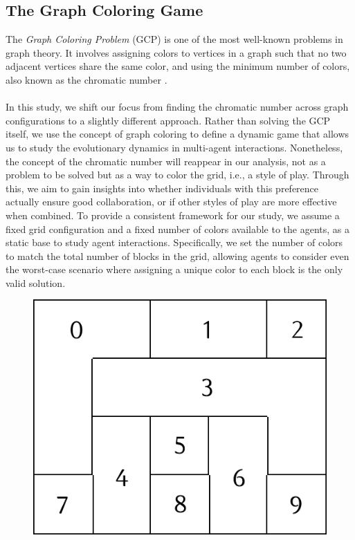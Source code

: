 \subsection{The Graph Coloring Game}

\begin{flushleft}

    The \emph{Graph Coloring Problem} (GCP) is one of the most well-known problems in graph theory. It involves assigning colors to vertices in a graph such that no two adjacent vertices share the same color, and using the minimum number of colors, also known as the chromatic number \cite{watkins2023generating}.\\~\\

    In this study, we shift our focus from finding the chromatic number across graph configurations to a slightly different approach. Rather than solving the GCP itself, we use the concept of graph coloring to define a dynamic game that allows us to study the evolutionary dynamics in multi-agent interactions. Nonetheless, the concept of the chromatic number will reappear in our analysis, not as a problem to be solved but as a way to color the grid, i.e., a style of play. Through this, we aim to gain insights into whether individuals with this preference actually ensure good collaboration, or if other styles of play are more effective when combined. To provide a consistent framework for our study, we assume a fixed grid configuration and a fixed number of colors available to the agents, as a static base to study agent interactions. Specifically, we set the number of colors to match the total number of blocks in the grid, allowing agents to consider even the worst-case scenario where assigning a unique color to each block is the only valid solution.
    \begin{figure}[h]
        \centering
        \begin{minipage}{0.46\linewidth}
            \centering
            \includegraphics[width=\linewidth]{images/grid.png}

\end{minipage}
\end{figure}
\end{flushleft}
